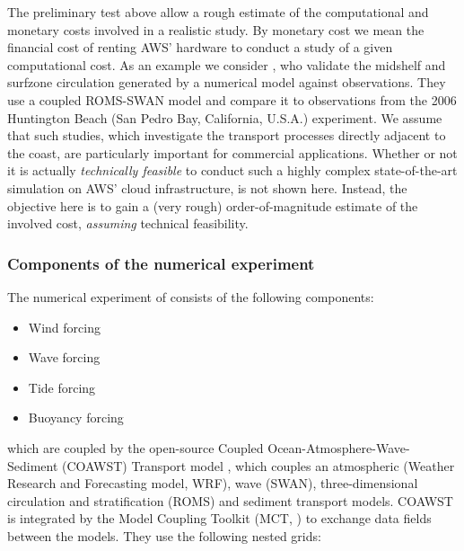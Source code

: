 \documentclass[12pt,a4paper]{article}
\begin{document}
The preliminary test above allow a rough estimate of the computational and monetary costs involved in a realistic study. By monetary cost we mean the financial cost of renting AWS' hardware to conduct a study of a given computational cost. As an example we consider \cite{kumar2015midshelf}, who validate the midshelf and surfzone circulation generated by a numerical model against observations.  They use a coupled ROMS-SWAN model and compare it to observations from the 2006 Huntington Beach (San Pedro Bay, California, U.S.A.) experiment. We assume that such studies, which investigate the transport processes directly adjacent to the coast, are particularly important for commercial applications. Whether or not it is actually \emph{technically feasible} to conduct such a highly complex state-of-the-art simulation on AWS' cloud infrastructure, is not shown here. Instead, the objective here is to gain a (very rough) order-of-magnitude estimate of the involved cost, \emph{assuming} technical feasibility. 

\subsubsection{Components of the numerical experiment}

The numerical experiment of \cite{kumar2015midshelf} consists of the following components:

\begin{itemize}
	\item Wind forcing
	\item Wave forcing
	\item Tide forcing
	\item Buoyancy forcing
\end{itemize}

which are coupled by the open-source Coupled Ocean-Atmosphere-Wave-Sediment (COAWST) Transport model \citep{warner2008using,web:coawst}, which couples an atmospheric (Weather Research and Forecasting model, WRF), wave (SWAN), three-dimensional circulation and stratification (ROMS) and sediment transport models. COAWST is integrated by the Model Coupling Toolkit (MCT, \citealt{web:mct}) to exchange data fields between the models. They use the following nested grids:
\end{document}

